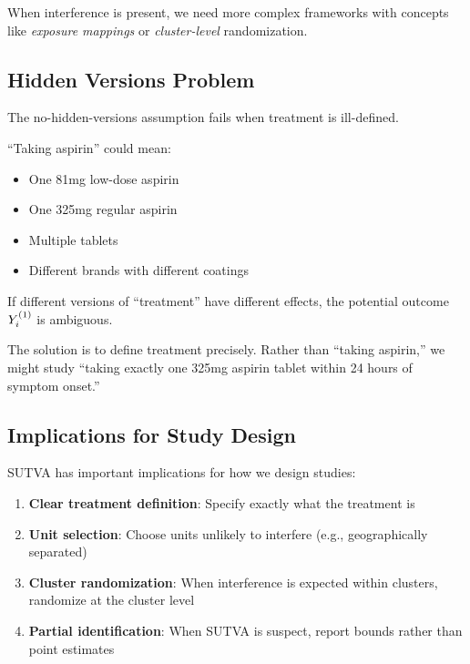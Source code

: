 When interference is present, we need more complex frameworks with concepts like \emph{exposure mappings} \cite{aronow2017estimating} or \emph{cluster-level} randomization.

\subsection{Hidden Versions Problem}

The no-hidden-versions assumption fails when treatment is ill-defined.

\begin{example}
\label{ex:hidden_versions}
``Taking aspirin'' could mean:
\begin{itemize}
    \item One 81mg low-dose aspirin
    \item One 325mg regular aspirin
    \item Multiple tablets
    \item Different brands with different coatings
\end{itemize}
If different versions of ``treatment'' have different effects, the potential outcome $Y^{(1)}_i$ is ambiguous.
\end{example}

The solution is to define treatment precisely. Rather than ``taking aspirin,'' we might study ``taking exactly one 325mg aspirin tablet within 24 hours of symptom onset.''

\subsection{Implications for Study Design}

SUTVA has important implications for how we design studies:

\begin{enumerate}
    \item \textbf{Clear treatment definition}: Specify exactly what the treatment is
    \item \textbf{Unit selection}: Choose units unlikely to interfere (e.g., geographically separated)
    \item \textbf{Cluster randomization}: When interference is expected within clusters, randomize at the cluster level
    \item \textbf{Partial identification}: When SUTVA is suspect, report bounds rather than point estimates
\end{enumerate}

